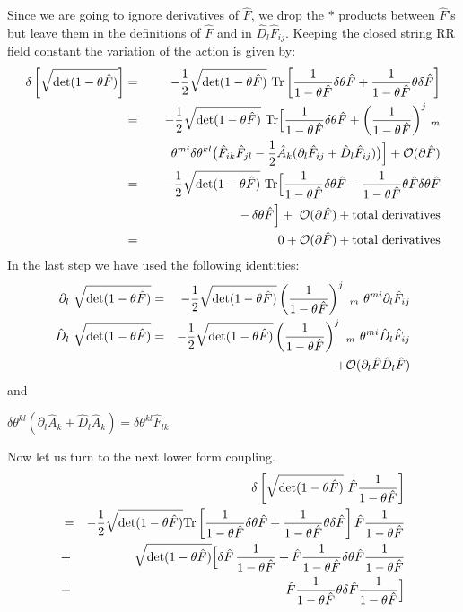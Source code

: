 \documentclass[a4paper,a4paper]{amsproc}
\theoremstyle{definition}
\theoremstyle{remark}
\numberwithin{equation}{section}
\begin{document}
Since we are going to ignore derivatives of $\hat F$, we drop the $*$
products between $\hat F$'s but leave them in the definitions of $\hat
F$ and in $\hat D_l \hat F_{ij}$. Keeping the closed string RR field
constant the variation of the action is given by:
%
\begin{eqnarray}
\delta \left[{\sqrt{\hbox{det}(1-\theta \hat F)}}\right]  &=&
-\frac{1}{2} {\sqrt{\hbox{det}(1-\theta \hat F)}}~ \hbox{Tr}\left[
{\frac{1}{1- \theta
\hat F}} \delta \theta \hat F + \frac{1}{1- \theta \hat F} \theta
\delta \hat F \right] \cr
&=& -\frac{1}{2} {\sqrt{\hbox{det}(1-\theta \hat F)}}~ \hbox{Tr} \Big[
\frac{1}{1- \theta
\hat F} \delta \theta \hat F + {\left({\frac{1}{1- \theta \hat
F}}\right)}^{j}~_{m} \cr
&&~~~~~\theta^{m i}\delta\theta^{kl}
\big({\hat
F}_{ik}{\hat F}_{jl} -\frac{1}{2}{\hat A}_k(\partial_l {\hat F}_{ij} +
{\hat D}_l {\hat F}_{ij})\big)\Big] + {\mathcal{O}}(\partial{\hat F}) \cr 
&=& -\frac{1}{2}{\sqrt{\hbox{det}(1-\theta \hat F)}}~\hbox{Tr}
\Big[{\frac{1}{1- \theta \hat F}}\delta \theta {\hat F} -
{\frac{1}{1- \theta \hat F}}\theta{\hat F}\delta \theta{\hat F}\cr
&& - \,\delta\theta {\hat F}\Big] + \, \, {\mathcal{O}}(\partial{\hat F}) 
+ \hbox{total derivatives} \cr
&=& 0 + {\mathcal{O}}(\partial{\hat F}) + {\hbox{total derivatives}}
\end{eqnarray}
%
In the last step we have used the following identities:
%
\begin{eqnarray}
\partial_l~ {\sqrt{\hbox{det}(1-\theta \hat F)}}
&=& -\frac{1}{2} {\sqrt
{\hbox{det}(1-\theta \hat F)}}\left({\frac{1}{1- \theta \hat F}}
\right)^{j}~_{m}~
\theta^{m i}\partial_l {\hat F}_{ij} \cr
{\hat D}_l~ {\sqrt{\hbox{det}(1-\theta \hat F)}}
&=& -\frac{1}{2} {\sqrt
{\hbox{det}(1-\theta \hat F)}}\left({\frac{1}{1- \theta \hat F}}
\right)^{j}~_{m}~
\theta^{m i}{\hat D}_l {\hat F}_{ij} \cr
&&\qquad + {\mathcal{O}}(\partial_l\hat F {\hat
D}_l\hat F)
\end{eqnarray}
%
and
%
\begin{center}
$\delta\theta^{kl}(\partial_l {\hat A}_k + \hat D_l \hat A_k) = \delta
\theta^{kl} \hat F_{lk}$
\end{center}
%
Now let us turn to the next lower form coupling. 
% 
\begin{eqnarray}
&&\delta \left[{\sqrt{\hbox{det}(1-\theta \hat F)}}\,\,\hat
F\frac{1}{1-\theta\hat F}\right]\cr
&=& -\frac{1}{2}{\sqrt{\hbox{det}(1-\theta \hat F)}}\hbox{Tr}\left[
{\frac{1}{1- \theta
\hat F}} \delta \theta \hat F + \frac{1}{1- \theta \hat F} \theta
\delta \hat F \right] \hat F\frac{1}{1-\theta\hat F} \cr
&+& {\sqrt{\hbox{det}(1-\theta \hat F)}}\Big[\delta\hat F\,
\frac{1}{1-\theta\hat F} + \hat F\frac{1}{1-\theta\hat F}\delta\theta
\hat F\frac{1}{1-\theta\hat F}\cr
&+& \hat F\frac{1}{1-\theta\hat F}\theta
\delta\hat F\frac{1}{1-\theta\hat F}\Big]
\end{eqnarray}
\end{document}
